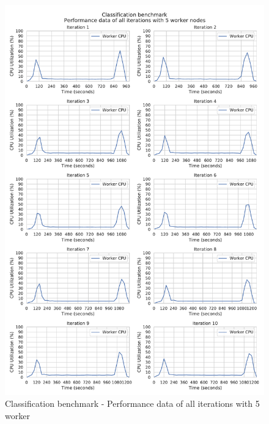 \begin{figure}[h]
\centering
\includegraphics[scale=0.5]{images/appendix/evaluation_data/classification_benchmark/classification_5_worker_cpu_performance}
\caption{Classification benchmark - Performance data of all iterations with 5 worker}
\label{fig:appendix_eval_classification_static5}
\end{figure}

